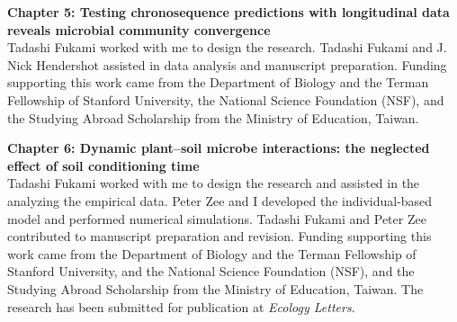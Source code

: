 \noindent \textbf{Chapter 5: Testing chronosequence predictions with longitudinal data reveals microbial community convergence}\\
\noindent Tadashi Fukami worked with me to design the research. Tadashi Fukami and J. Nick Hendershot assisted in data analysis and manuscript preparation. Funding supporting this work came from the Department of Biology and the Terman Fellowship of Stanford University, the National Science Foundation (NSF), and the Studying Abroad Scholarship from the Ministry of Education, Taiwan.
\bigskip


\noindent \textbf{Chapter 6: Dynamic plant--soil microbe interactions: the neglected effect of soil conditioning time}\\
\noindent Tadashi Fukami worked with me to design the research and assisted in the analyzing the empirical data. Peter Zee and I developed the individual-based model and performed numerical simulations. Tadashi Fukami and Peter Zee contributed to manuscript preparation and revision. Funding supporting this work came from the Department of Biology and the Terman Fellowship of Stanford University, and the National Science Foundation (NSF), and the Studying Abroad Scholarship from the Ministry of Education, Taiwan. The research has been submitted for publication at \textit{Ecology Letters}.

